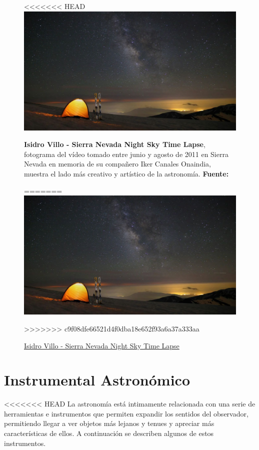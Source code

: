 \begin{itemize}
\begin{itemize}
\begin{figure}
\centering
<<<<<<< HEAD
\includegraphics[width=1\linewidth]{../images/nightsky}
\caption[Sierra Nevada Night Sky Time Lapse]{\textbf{Isidro Villo - Sierra Nevada Night Sky Time Lapse}, fotograma del vídeo tomado entre junio y agosto de 2011 en Sierra Nevada en memoria de su compañero Iker Canales Onaindia, muestra el lado más creativo y artístico de la astronomía. \textbf{Fuente:} \cite{sierra_nevada_sky}}
=======
\includegraphics[width=0.7\linewidth]{../images/nightsky}
\caption{\href{https://vimeo.com/28399458}{Isidro Villo - Sierra Nevada Night Sky Time Lapse}}
>>>>>>> c9f08dfe66521d4f0dba18e652f93a6a37a333aa
\label{fig:nightsky}
\end{figure}



\section{Instrumental Astronómico}

<<<<<<< HEAD
La astronomía está intimamente relacionada con una serie de herramientas e instrumentos que permiten expandir los sentidos del observador, permitiendo llegar a ver objetos más lejanos y tenues y apreciar más características de ellos. A continuación se describen algunos de estos instrumentos. 


\end{itemize}
\end{itemize}
